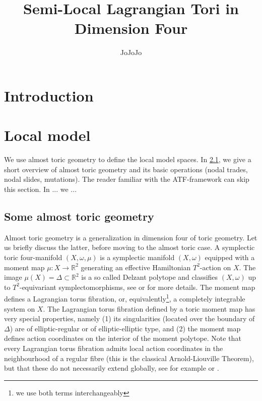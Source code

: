 \documentclass[12pt,a4paper,draft]{scrartcl}
\begin{document}
\title{Semi-Local Lagrangian Tori in Dimension Four}
\author{JoJoJo}

\maketitle

\section{Introduction}

\section{Local model}

We use almost toric geometry to define the local model spaces. In \cref{sec:atgeometry}, we give a short overview of almost toric geometry and its basic operations (nodal trades, nodal slides, mutations). The reader familiar with the ATF-framework can skip this section. In ... we ...


\subsection{Some almost toric geometry}
\label{sec:atgeometry}

Almost toric geometry is a generalization in dimension four of toric geometry. Let us briefly discuss the latter, before moving to the almost toric case. A symplectic toric four-manifold $(X,\omega,\mu)$ is a symplectic manifold $(X,\omega)$ equipped with a moment map $\mu \colon X \rightarrow \mathbb{R}^2$ generating an effective Hamiltonian $T^2$-action on $X$. The image $\mu(X) = \Delta \subset \mathbb{R}^2$ is a so called Delzant polytope and classifies $(X,\omega)$ up to $T^2$-equivariant symplectomorphisms, see \cite{Del88} or \cite{Can03} for more details. The moment map defines a Lagrangian torus fibration, or, equivalently\footnote{we use both terms interchangeably}, a completely integrable system on $X$. The Lagrangian torus fibration defined by a toric moment map has very special properties, namely (1) its singularities (located over the boundary of $\Delta$) are of elliptic-regular or of elliptic-elliptic type, and (2) the moment map defines action coordinates on the interior of the moment polytope. Note that every Lagrangian torus fibration admits local action coordinates in the neighbourhood of a regular fibre (this is the classical Arnold-Liouville Theorem), but that these do not necessarily extend globally, see for example \cite{Dui80} or \cite{Zun96,Zun03}.
\end{document}
